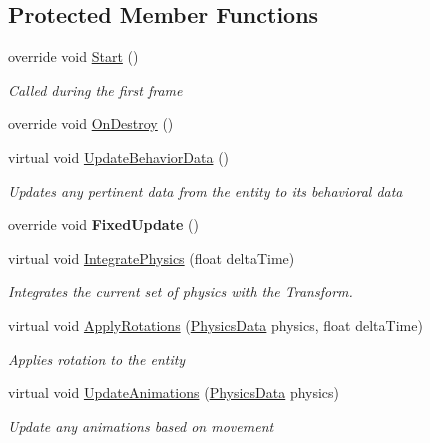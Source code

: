 \subsection*{Protected Member Functions}
\begin{DoxyCompactItemize}
\item 
\hypertarget{class_skyrates_1_1_entity_1_1_entity_a_i_aff5f7c0c33ac92d84573223f69d732f4}{override void \hyperlink{class_skyrates_1_1_entity_1_1_entity_a_i_aff5f7c0c33ac92d84573223f69d732f4}{Start} ()}\label{class_skyrates_1_1_entity_1_1_entity_a_i_aff5f7c0c33ac92d84573223f69d732f4}

\begin{DoxyCompactList}\small\item\em Called during the first frame  \end{DoxyCompactList}\item 
\hypertarget{class_skyrates_1_1_entity_1_1_entity_a_i_a9ae1ed93797795acba8fd538a9eccc78}{override void \hyperlink{class_skyrates_1_1_entity_1_1_entity_a_i_a9ae1ed93797795acba8fd538a9eccc78}{On\-Destroy} ()}\label{class_skyrates_1_1_entity_1_1_entity_a_i_a9ae1ed93797795acba8fd538a9eccc78}

\item 
virtual void \hyperlink{class_skyrates_1_1_entity_1_1_entity_a_i_a0b310596b7b7445dccb373432fdfddc9}{Update\-Behavior\-Data} ()
\begin{DoxyCompactList}\small\item\em Updates any pertinent data from the entity to its behavioral data \end{DoxyCompactList}\item 
\hypertarget{class_skyrates_1_1_entity_1_1_entity_a_i_a2adf5435ca29e4a8bb3945ca5759b4f7}{override void {\bfseries Fixed\-Update} ()}\label{class_skyrates_1_1_entity_1_1_entity_a_i_a2adf5435ca29e4a8bb3945ca5759b4f7}

\item 
virtual void \hyperlink{class_skyrates_1_1_entity_1_1_entity_a_i_a44c60428a7213c22b086aef162e0cb8f}{Integrate\-Physics} (float delta\-Time)
\begin{DoxyCompactList}\small\item\em Integrates the current set of physics with the Transform. \end{DoxyCompactList}\item 
virtual void \hyperlink{class_skyrates_1_1_entity_1_1_entity_a_i_a5e16be1f4959b4199277f2f8af717b3b}{Apply\-Rotations} (\hyperlink{class_skyrates_1_1_physics_1_1_physics_data}{Physics\-Data} physics, float delta\-Time)
\begin{DoxyCompactList}\small\item\em Applies rotation to the entity \end{DoxyCompactList}\item 
virtual void \hyperlink{class_skyrates_1_1_entity_1_1_entity_a_i_a24547ecc7fbc9ab18b76d3fde528b8e0}{Update\-Animations} (\hyperlink{class_skyrates_1_1_physics_1_1_physics_data}{Physics\-Data} physics)
\begin{DoxyCompactList}\small\item\em Update any animations based on movement \end{DoxyCompactList}\end{DoxyCompactItemize}
